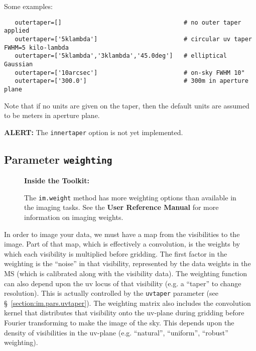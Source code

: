 Some examples:
\small
\begin{verbatim}
   outertaper=[]                                  # no outer taper applied
   outertaper=['5klambda']                        # circular uv taper FWHM=5 kilo-lambda
   outertaper=['5klambda','3klambda','45.0deg']   # elliptical Gaussian
   outertaper=['10arcsec']                        # on-sky FWHM 10"
   outertaper=['300.0']                           # 300m in aperture plane
\end{verbatim}
\normalsize
Note that if no units are given on the taper, then the default units
are assumed to be meters in aperture plane.

{\bf ALERT:} The {\tt innertaper} option is not yet implemented. 


\subsection{Parameter {\tt weighting} }
\label{section:im.pars.weighting}

\begin{wrapfigure}{r}{2.5in}
  \begin{boxedminipage}{2.5in}
     \centerline{\bf Inside the Toolkit:}
     The {\tt im.weight} method has more weighting options
     than available in the imaging tasks.  See the 
     {\bf User Reference Manual} for more information on
     imaging weights.
  \end{boxedminipage}
\end{wrapfigure}

In order to image your data, we must have a map from the visibilities
to the image.  Part of that map, which is effectively a convolution,
is the weights by which each visibility is multiplied before gridding.
The first factor in the weighting is the ``noise'' in that visibility,
represented by the data weights in the MS (which is calibrated along
with the visibility data).
The weighting function can also depend upon the uv locus of that visibility
(e.g. a ``taper'' to change resolution).  This is actually controlled
by the {\tt uvtaper} parameter (see \S~\ref{section:im.pars.uvtaper}).
The weighting matrix also includes the convolution kernel that
distributes that visibility onto the uv-plane during gridding before
Fourier transforming to make the image of the sky.  This depends upon
the density of visibilities in the uv-plane (e.g. ``natural'',
``uniform'', ``robust'' weighting).

